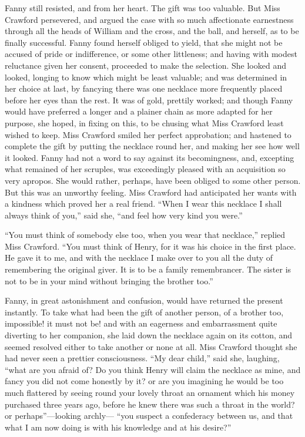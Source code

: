 \documentclass{article}
\begin{document}
Fanny still resisted, and from her heart.  The gift was
too valuable.  But Miss Crawford persevered, and argued
the case with so much affectionate earnestness through
all the heads of William and the cross, and the ball,
and herself, as to be finally successful.  Fanny found
herself obliged to yield, that she might not be accused
of pride or indifference, or some other littleness;
and having with modest reluctance given her consent,
proceeded to make the selection.  She looked and looked,
longing to know which might be least valuable; and was
determined in her choice at last, by fancying there was
one necklace more frequently placed before her eyes than
the rest.  It was of gold, prettily worked; and though Fanny
would have preferred a longer and a plainer chain as more
adapted for her purpose, she hoped, in fixing on this,
to be chusing what Miss Crawford least wished to keep.
Miss Crawford smiled her perfect approbation; and hastened
to complete the gift by putting the necklace round her,
and making her see how well it looked.  Fanny had not a
word to say against its becomingness, and, excepting what
remained of her scruples, was exceedingly pleased with an
acquisition so very apropos.  She would rather, perhaps,
have been obliged to some other person.  But this was
an unworthy feeling.  Miss Crawford had anticipated her
wants with a kindness which proved her a real friend.
``When I wear this necklace I shall always think of you,''
said she, ``and feel how very kind you were.''

``You must think of somebody else too, when you wear
that necklace,'' replied Miss Crawford.  ``You must think
of Henry, for it was his choice in the first place.
He gave it to me, and with the necklace I make over
to you all the duty of remembering the original giver.
It is to be a family remembrancer.  The sister is not to be
in your mind without bringing the brother too.''

Fanny, in great astonishment and confusion, would have
returned the present instantly.  To take what had
been the gift of another person, of a brother too,
impossible! it must not be! and with an eagerness and
embarrassment quite diverting to her companion, she laid
down the necklace again on its cotton, and seemed resolved
either to take another or none at all.  Miss Crawford
thought she had never seen a prettier consciousness.
``My dear child,'' said she, laughing, ``what are you afraid of?
Do you think Henry will claim the necklace as mine,
and fancy you did not come honestly by it? or are you
imagining he would be too much flattered by seeing
round your lovely throat an ornament which his money
purchased three years ago, before he knew there was such
a throat in the world? or perhaps''---looking archly---%
``you suspect a confederacy between us, and that what
I am now doing is with his knowledge and at his desire?''
\end{document}
